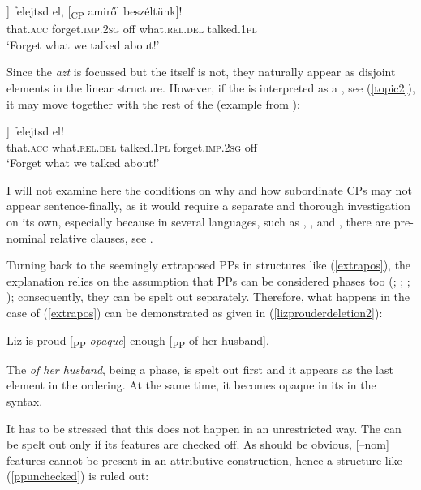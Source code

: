 \ea \gll [\textsubscript{DP} Azt [\textsubscript{CP} \emph{opaque}]] felejtsd el, [\textsubscript{CP}	amiről beszéltünk]! \label{focus2}\\
{} that.\textsc{acc} {} {} forget.\textsc{imp.2sg}	off	{} what.\textsc{rel.del} talked.\textsc{1pl}\\
\glt `Forget what we talked about!'
\z

Since the  \textit{azt} is focussed but the  itself is not, they naturally appear as disjoint elements in the linear structure. However, if the  is interpreted as a , see (\ref{topic2}), it may move together with the rest of the  (example from \citealt[244, ex. 40a]{ekiss2002}):

\ea \gll	[\textsubscript{DP}	Azt, [\textsubscript{CP} amiről	beszéltünk,]] felejtsd el! \label{topic2}\\
{} that.\textsc{acc} {} what.\textsc{rel.del}	talked.\textsc{1pl} forget.\textsc{imp.2sg}	off\\
\glt `Forget what we talked about!'
\z

I will not examine here the conditions on why and how subordinate CPs may not appear sentence-finally, as it would require a separate and thorough investigation on its own, especially because in several languages, such as , ,  and , there are pre-nominal relative clauses, see \citet{larsontakahashi2007}.

Turning back to the seemingly extraposed PPs in structures like (\ref{extrapos}), the explanation relies on the assumption that PPs can be considered phases too (\citealt{leeschoenfeld2007}; \citealt{drummondhornsteinlasnik2010}; \citealt{gallego2010}; \citealt{fowlie2010}); consequently, they can be spelt out separately. Therefore, what happens in the case of (\ref{extrapos}) can be demonstrated as given in (\ref{lizprouderdeletion2}):

\ea	Liz is proud [\textsubscript{PP} \emph{opaque}] enough [\textsubscript{PP} of her husband]. \label{lizprouderdeletion2}
\z

The  \textit{of her husband}, being a phase, is spelt out first and it appears as the last element in the  ordering. At the same time, it becomes opaque in its  in the syntax.

It has to be stressed that this does not happen in an unrestricted way. The  can be spelt out only if its features are checked off. As should be obvious, [--nom] features cannot be present in an attributive construction, hence a structure like (\ref{ppunchecked}) is ruled out:


